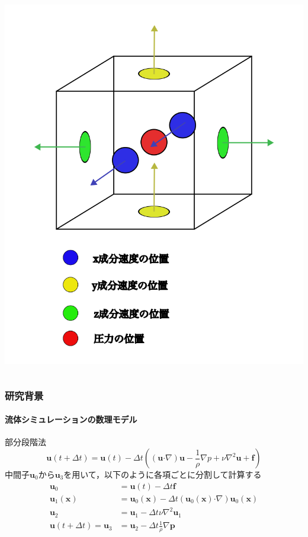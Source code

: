 \documentclass[aspectratio=169,dvipdfmx,hyperref={bookmarks=true}]{beamer}
\begin{document}
\begin{frame}
\begin{columns}[T]
\begin{column}{0.35\linewidth}
	\includegraphics[width=1.1\linewidth]{images/3dstaggerd.png}
	\label{fig:staggerd}
    	\end{column}
    \end{columns}
\end{frame}
  \begin{frame}
  \frametitle{研究背景}
  \framesubtitle{流体シミュレーションの数理モデル}
    \begin{block}{部分段階法}
    	\[
	\bm{u}(t + \varDelta t)  =\bm{u}(t) -\varDelta t( (\bm{u} \boldsymbol{\cdot}\nabla) \bm{u} - \frac{1}{\rho}\nabla p + \nu\nabla^2\bm{u} + \bm{f})
	\]
中間子$\bm{u}_0$から$\bm{u}_3$を用いて，以下のように各項ごとに分割して計算する
\begin{align*}
	\bm{u}_0				& =  \bm{u} (t)  - \varDelta t \bm{f} 				\\
	\bm{u}_1 (\bm{x}) 		&= \bm{u}_0 (\bm{x}) - \varDelta t (\bm{u}_0(\bm{x})  \boldsymbol{\cdot}\nabla) \bm{u}_0(\bm{x})	\\
	\bm{u}_2  		 		&=  \bm{u}_1 - \varDelta t \nu\nabla^2\bm{u}_1		\\
	\bm{u} (t + \varDelta t) = \bm{u}_3  &=  \bm{u}_2 - \varDelta t \frac{1}{\rho}\nabla \bm{p}
	\end{align*}
\end{block}
\end{frame}
\end{document}
